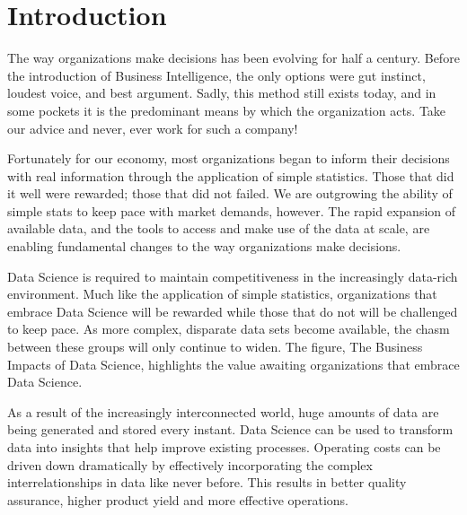 \documentclass{rapportECL}
\begin{document}



        
\fairepagedegarde %
\tabledematieres %
\tableofcontents
\newpage








\section{Introduction}

The way organizations make decisions has been evolving for half a century. Before the introduction of Business Intelligence, the only options were gut instinct, loudest voice, and best argument. Sadly, this method still exists today, and in some pockets it is the predominant means by which the organization acts. Take our advice and never, ever work for such a company!

Fortunately for our economy, most organizations began to inform their decisions with real information through the application of simple statistics. Those that did it well were rewarded; those that did not failed. We are outgrowing the ability of simple stats to keep pace with market demands, however. The rapid expansion of available data, and the tools to access and make use of the data at scale, are enabling fundamental changes to the way organizations make decisions.

Data Science is required to maintain competitiveness in the increasingly data-rich environment. Much like the application of simple statistics, organizations that embrace Data Science will be rewarded while those that do not will be challenged to keep pace. As more complex, disparate data sets become available, the chasm between these groups will only continue to widen. The figure,
The Business Impacts of Data Science, highlights the value awaiting organizations that embrace Data Science.

As a result of the increasingly interconnected world, huge amounts of data are being generated and stored every instant. Data Science can be used to transform data into insights that help improve existing processes. Operating costs
can be driven down dramatically by effectively incorporating the complex interrelationships in data like never before. This results in better quality assurance, higher product yield and more effective operations.
\end{document}
